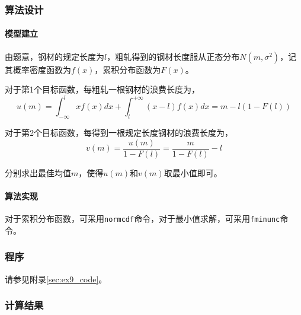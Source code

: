 
\subsubsection{算法设计}

\paragraph{模型建立} 由题意，钢材的规定长度为$l$，粗轧得到的钢材长度服从正态分布$N(m,\sigma^2)$，记其概率密度函数为$f(x)$，累积分布函数为$F(x)$。

对于第1个目标函数，每粗轧一根钢材的浪费长度为，
\begin{equation}
    u(m) = \int_{-\infty}^l xf(x)dx + \int_l^{+\infty} (x-l)f(x)dx = m - l(1-F(l))
\end{equation}

对于第2个目标函数，每得到一根规定长度钢材的浪费长度为，
\begin{equation}
    v(m) = \frac{u(m)}{1-F(l)} = \frac{m}{1-F(l)} - l
\end{equation}

分别求出最佳均值$m$，使得$u(m)$和$v(m)$取最小值即可。

\paragraph{算法实现} 对于累积分布函数，可采用\texttt{normcdf}命令，对于最小值求解，可采用\texttt{fminunc}命令。

\subsubsection{程序}

请参见附录\ref{sec:ex9_code}。

\subsubsection{计算结果}

